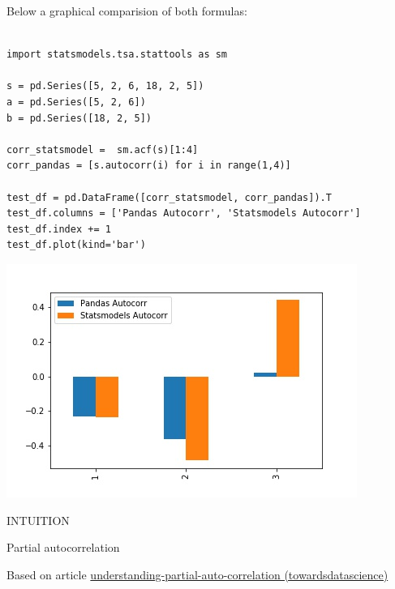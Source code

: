 Below a graphical comparision of both formulas:

\lstset{language=Python}
\lstset{frame=lines}
\lstset{basicstyle=\footnotesize}
\begin{lstlisting}

import statsmodels.tsa.stattools as sm

s = pd.Series([5, 2, 6, 18, 2, 5])
a = pd.Series([5, 2, 6])
b = pd.Series([18, 2, 5])

corr_statsmodel =  sm.acf(s)[1:4]
corr_pandas = [s.autocorr(i) for i in range(1,4)]

test_df = pd.DataFrame([corr_statsmodel, corr_pandas]).T
test_df.columns = ['Pandas Autocorr', 'Statsmodels Autocorr']
test_df.index += 1
test_df.plot(kind='bar')

\end{lstlisting}

\begin{center}
\includegraphics[scale=0.6]{corr_comparison.jpg}
\end{center}

\vspace{5mm}


INTUITION


\vspace{5mm}

Partial autocorrelation

\vspace{5mm}

Based on article \href{https://towardsdatascience.com/understanding-partial-auto-correlation-fa39271146ac}{understanding-partial-auto-correlation (towardsdatascience)}

\vspace{5mm}


